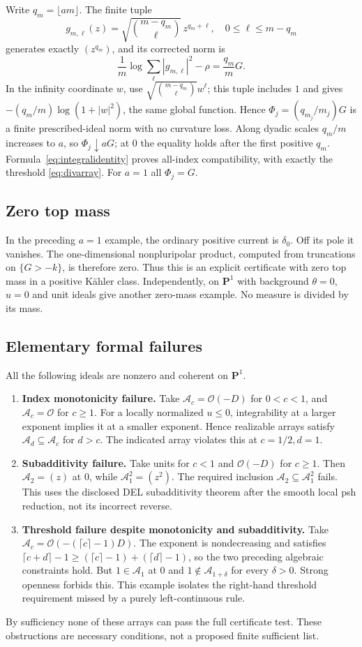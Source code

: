 \documentclass[11pt]{article}
\newcommand{\A}{\mathcal A}
\newcommand{\OO}{\mathcal O}
\theoremstyle{definition}
\begin{document}
Write $q_m=\lfloor am\rfloor$. The finite tuple
\[
 g_{m,\ell}(z)=\sqrt{\binom{m-q_m}{\ell}}\,z^{q_m+\ell},
 \quad 0\leq\ell\leq m-q_m
\]
generates exactly $(z^{q_m})$, and its corrected norm is
\[
 \frac1m\log\sum_\ell|g_{m,\ell}|^2-\rho
   =\frac{q_m}{m}G.
\]
In the infinity coordinate $w$, use
$\sqrt{\binom{m-q_m}{\ell}}w^\ell$; this tuple includes $1$
and gives $-(q_m/m)\log(1+|w|^2)$, the same global function.
Hence $\Phi_j=(q_{m_j}/m_j)G$ is a finite prescribed-ideal norm
with no curvature loss. Along dyadic scales $q_m/m$ increases
to $a$, so $\Phi_j\downarrow aG$; at $0$ the equality holds
after the first positive $q_m$. Formula~\eqref{eq:integralidentity}
proves all-index compatibility, with exactly the threshold
\eqref{eq:divarray}. For $a=1$ all $\Phi_j=G$.

\subsection{Zero top mass}
In the preceding $a=1$ example, the ordinary positive current is
$\delta_0$. Off its pole it vanishes. The one-dimensional
nonpluripolar product, computed from truncations on $\{G>-k\}$,
is therefore zero. Thus this is an explicit certificate with
zero top mass in a positive K\"ahler class. Independently, on
$\mathbf P^1$ with background $\theta=0$, $u=0$ and unit ideals
give another zero-mass example. No measure is divided by its mass.

\subsection{Elementary formal failures}
All the following ideals are nonzero and coherent on $\mathbf P^1$.
\begin{enumerate}
\item \textbf{Index monotonicity failure.}
Take $\A_c=\OO(-D)$ for $0<c<1$, and $\A_c=\OO$ for $c\geq1$.
For a locally normalized $u\leq0$, integrability at a larger
exponent implies it at a smaller exponent. Hence realizable
arrays satisfy $\A_d\subseteq\A_c$ for $d>c$.
The indicated array violates this at $c=1/2,d=1$.
\item \textbf{Subadditivity failure.}
Take units for $c<1$ and $\OO(-D)$ for $c\geq1$.
Then $\A_2=(z)$ at $0$, while $\A_1^2=(z^2)$.
The required inclusion $\A_2\subseteq\A_1^2$ fails. This uses
the disclosed DEL subadditivity theorem after the smooth local
psh reduction, not its incorrect reverse.
\item \textbf{Threshold failure despite monotonicity and subadditivity.}
Take $\A_c=\OO(- (\lceil c\rceil-1)D)$.
The exponent is nondecreasing and satisfies
$\lceil c+d\rceil-1\geq(\lceil c\rceil-1)+(\lceil d\rceil-1)$,
so the two preceding algebraic constraints hold. But $1\in\A_1$
at $0$ and $1\notin\A_{1+\delta}$ for every $\delta>0$.
Strong openness forbids this. This example isolates the right-hand
threshold requirement missed by a purely left-continuous rule.
\end{enumerate}
By sufficiency none of these arrays can pass the full certificate
test. These obstructions are necessary conditions, not a proposed
finite sufficient list.
\end{document}
